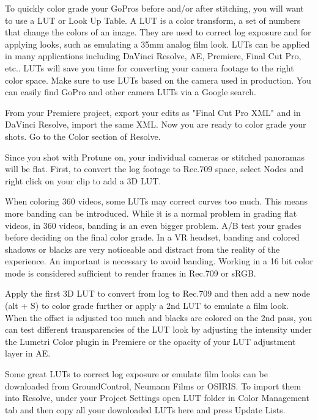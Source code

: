 \begin{fullwidth}

To quickly color grade your GoPros before and/or after stitching, you will want to use a LUT or Look Up Table. A LUT is a color transform, a set of numbers that change the colors of an image. They are used to correct log exposure and for applying looks, such as emulating a 35mm analog film look. LUTs can be applied in many applications including DaVinci Resolve, AE, Premiere, Final Cut Pro, etc.. LUTs will save you time for converting your camera footage to the right color space. Make sure to use LUTs based on the camera used in production. You can easily find GoPro and other camera LUTs via a Google search.

From your Premiere project, export your edits as "Final Cut Pro XML" and in DaVinci Resolve, import the same XML. Now you are ready to color grade your shots. Go to the Color section of Resolve.


Since you shot with Protune on, your individual cameras or stitched panoramas will be flat. First, to convert the log footage to Rec.709 space, select Nodes and right click on your clip to add a 3D LUT. 


When coloring 360 videos, some LUTs may correct curves too much. This means more banding can be introduced. While it is a normal problem in grading flat videos, in 360 videos, banding is an even bigger problem. A/B test your grades before deciding on the final color grade. In a VR headset, banding and colored shadows or blacks are very noticeable and distract from the reality of the experience. An important \textbf{} is necessary to avoid banding. Working in a 16 bit color mode is considered sufficient to render frames in Rec.709 or sRGB.


Apply the first 3D LUT to convert from log to Rec.709 and then add a new node (alt + S) to color grade further or apply a 2nd LUT to emulate a film look. When the offset is adjusted too much and blacks are colored on the 2nd pass, you can test different transparencies of the LUT look by adjusting the intensity under the Lumetri Color plugin in Premiere or the opacity of your LUT adjustment layer in AE.


\tip Some great LUTs to correct log exposure or emulate film looks can be downloaded from GroundControl, Neumann Films or OSIRIS. To import them into Resolve, under your Project Settings open LUT folder in Color Management tab and then copy all your downloaded LUTs here and press Update Lists.  


\end{fullwidth}
